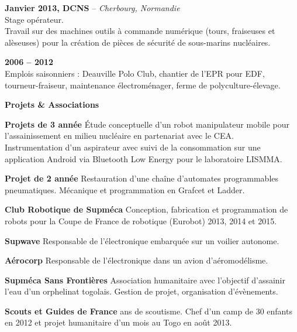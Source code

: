 \documentclass[a4paper,11pt,final]{memoir}
\newcommand{\Sep}{\vspace{1.5em}}
\newcommand{\SmallSep}{\vspace{0.5em}}
\newcommand{\CVSection}[1]
	{\Large\textbf{#1}\par
	\SmallSep\normalsize\normalfont}
\newcommand{\CVItem}[2]
	{\textbf{\color{RoyalBlue} #1 \color{dark_gray} #2}\normalsize\normalfont}
\newcommand{\city}[1]
	{{\small\color{dark_gray}\emph{#1}}\normalsize\normalfont}
\begin{document}
\CVItem{Janvier 2013,}{DCNS} -- \city{Cherbourg, Normandie}\\
Stage opérateur.\\
Travail sur des machines outils à commande numérique (tours, fraiseuses et alèseuses) pour la création de pièces de sécurité de sous-marins nucléaires.
\SmallSep

\CVItem{2006 -- 2012}{}\\
Emplois saisonniers : Deauville Polo Club, chantier de l'EPR pour EDF, tourneur-fraiseur, maintenance électroménager, ferme de polyculture-élevage.
\Sep

\CVSection{Projets \& Associations}
\CVItem{Projets de 3\ieme{} année}{}Étude conceptuelle d'un robot manipulateur mobile pour l'assainissement en milieu nucléaire en partenariat avec le CEA.\\
Instrumentation d'un aspirateur avec suivi de la consommation sur une application Android via Bluetooth Low Energy pour le laboratoire LISMMA.
\SmallSep

\CVItem{Projet de 2\ieme{} année}{}Restauration d'une chaîne d'automates programmables pneumatiques. Mécanique et programmation en Grafcet et Ladder.
\SmallSep

\CVItem{Club Robotique de Supméca}{}Conception, fabrication et programmation de robots pour la Coupe de France de robotique (Eurobot) 2013, 2014 et 2015.
\SmallSep

\CVItem{Supwave}{}Responsable de l'électronique embarquée sur un voilier autonome.
\SmallSep

\CVItem{Aérocorp}{}Responsable de l'électronique dans un avion d'aéromodélisme.
\SmallSep

\CVItem{Supméca Sans Frontières}{}Association humanitaire avec l'objectif d'assainir l'eau d'un orphelinat togolais. Gestion de projet, organisation d'évènements.
\SmallSep

\CVItem{Scouts et Guides de France}{}8 ans de scoutisme. Chef d'un camp de 30 enfants en 2012 et projet humanitaire d'un mois au Togo en août 2013.

\end{document}
